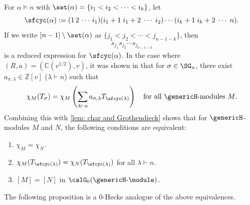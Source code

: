 \documentclass[12pt, reqno]{amsart}
\theoremstyle{plain}
\theoremstyle{definition}
\numberwithin{equation}{section}
\numberwithin{figure}{section}
\numberwithin{table}{section}
\def\Z{\mathbb Z}
\def\C{\mathbb C}
\begin{document}
For $\alpha \models n$ with $\set(\alpha) = \{i_1 < i_2 < \cdots < i_k \}$, let
\[
\sfcyc(\alpha) := (1 \, 2 \, \cdots \, i_1) (i_1+1 \; i_1 + 2 \; \cdots \; i_2) \cdots (i_k + 1 \; i_k + 2 \; \cdots \; n).
\]
If we write $[n-1] \setminus \set(\alpha)$ as $\{j_1 <  j_2 < \cdots < j_{n-1-k}\}$, then
\begin{align}\label{eq: reduced exp of cyc}
s_{j_1} s_{j_2}  \cdots s_{j_{n-1-k}}
\end{align}
is a reduced expression for $\sfcyc(\alpha)$.
In the case where $(R,a) = (\C(v^{1/2}), v)$, it was shown in \cite[Theorem~5.1]{91Ram} that for $\sigma \in \SG_n$, there exist $a_{\sigma, \lambda} \in \Z[v]$ ($\lambda \vdash n$) such that 
\begin{align*}
\chi_M(T_{\sigma}) 
= \chi_M\left( \sum_{\lambda \vdash n} a_{\sigma, \lambda} T_{\sfcyc(\lambda)}\right)\quad\text{for all $\genericH$-modules $M$.}
\end{align*}
Combining this with \cref{lem: char and Grothendieck} shows that for $\genericH$-modules $M$ and $N$, the following conditions are equivalent:
\begin{enumerate}[label = {\rm (\roman*)}]
\item 
$\chi_M = \chi_N$.
\item 
$\chi_M(T_{\sfcyc(\lambda)}) = \chi_N(T_{\sfcyc(\lambda)})$ for all $\lambda \vdash n$.
\item 
$[M] = [N]$ in $\calG_0(\genericH\text{-}\module)$.
\end{enumerate}










The following proposition is a $0$-Hecke analogue of the above equivalences.
\end{document}
